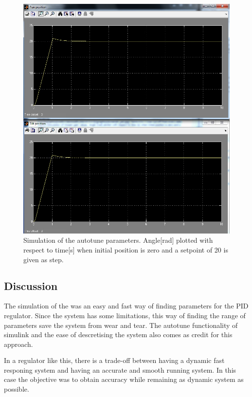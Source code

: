 \begin{figure}[htb]
	\centering
	\includegraphics[width=\textwidth,trim=0 0 0 0]{graphics/screensh_pid.jpg} %
	\caption{Simulation of the autotune parameters. Angle[rad] plotted with respect to time[s] when initial position is zero and a setpoint of 20 is given as step.}
	\label{fig:chosen_plot}			%
\end{figure}

\subsection{Discussion}
The simulation of the was an easy and fast way of finding parameters for the PID regulator. Since the system has some limitations, this way of finding the range of parameters save the system from wear and tear. The autotune functionality of simulink and the ease of descretising the system also comes as credit for this approach.

In a regulator like this, there is a trade-off between having a dynamic fast responing system and having an accurate and smooth running system. In this case the objective was to obtain accuracy while remaining as dynamic system as possible.

